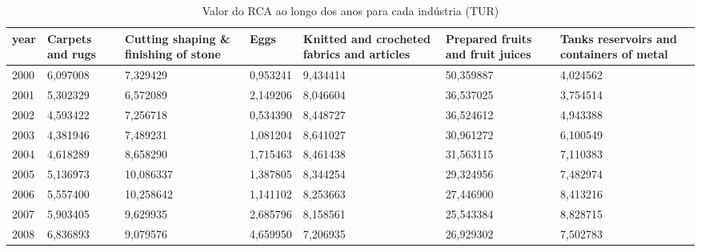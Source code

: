 \begin{table}
\centering
\caption{Valor do RCA ao longo dos anos para cada indústria (TUR)}
\begin{tabular}{p{1cm}p{2cm}p{2cm}p{2cm}p{2cm}p{2cm}p{2cm}}
\toprule
 year &  Carpets and rugs &  Cutting shaping \& finishing of stone &      Eggs &  Knitted and crocheted fabrics and articles &  Prepared fruits and fruit juices &  Tanks reservoirs and containers of metal \\
\midrule
 2000 &          6,097008 &                              7,329429 &  0,953241 &                                    9,434414 &                         50,359887 &                                  4,024562 \\
 2001 &          5,302329 &                              6,572089 &  2,149206 &                                    8,046604 &                         36,537025 &                                  3,754514 \\
 2002 &          4,593422 &                              7,256718 &  0,534390 &                                    8,448727 &                         36,524612 &                                  4,943388 \\
 2003 &          4,381946 &                              7,489231 &  1,081204 &                                    8,641027 &                         30,961272 &                                  6,100549 \\
 2004 &          4,618289 &                              8,658290 &  1,715463 &                                    8,461438 &                         31,563115 &                                  7,110383 \\
 2005 &          5,136973 &                             10,086337 &  1,387805 &                                    8,344254 &                         29,324956 &                                  7,482974 \\
 2006 &          5,557400 &                             10,258642 &  1,141102 &                                    8,253663 &                         27,446900 &                                  8,413216 \\
 2007 &          5,903405 &                              9,629935 &  2,685796 &                                    8,158561 &                         25,543384 &                                  8,828715 \\
 2008 &          6,836893 &                              9,079576 &  4,659950 &                                    7,206935 &                         26,929302 &                                  7,502783 \\

\end{tabular}
\end{table}
